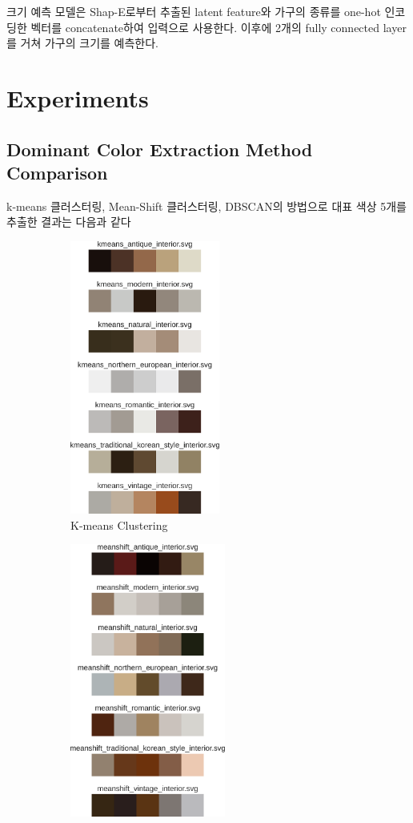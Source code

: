 \documentclass[11pt]{article}
\begin{document}
크기 예측 모델은 Shap-E로부터 추출된 latent feature와 가구의 종류를 one-hot 인코딩한 벡터를 concatenate하여 입력으로 사용한다.
이후에 2개의 fully connected layer를 거쳐 가구의 크기를 예측한다.

\section{Experiments}
\subsection{Dominant Color Extraction Method Comparison}
k-means 클러스터링, Mean-Shift 클러스터링, DBSCAN의 방법으로 대표 색상 5개를 추출한 결과는 다음과 같다
\begin{figure}[htbp]
    \centering
    \begin{subfigure}[b]{0.3\textwidth}
        \centering
        \includegraphics[height=9cm]{figures/kmeans_dominant_color.pdf}
        \caption{K-means Clustering}
        \label{fig:kmeans}
    \end{subfigure}
    \begin{subfigure}[b]{0.3\textwidth}
        \centering
        \includegraphics[height=9cm]{figures/meanshift_dominant_color.pdf}

\end{subfigure}
\end{figure}
\end{document}
